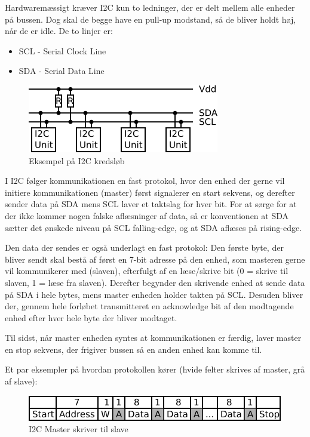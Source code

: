 Hardwaremæssigt kræver I2C kun to ledninger, der er delt mellem alle enheder på bussen. Dog skal de begge have en pull-up modstand, så de bliver holdt høj, når de er idle. De to linjer er:

\begin{itemize}
    \item SCL - Serial Clock Line
    \item SDA - Serial Data Line
\end{itemize}

\begin{figure}[H] \centering
    \includegraphics{0_Filer/Figuer/5_HW_Design/I2C_opsaetning.png}
    \caption{Eksempel på I2C kredsløb}
    \label{fig:HWD_I2C_kreds}
\end{figure}

I I2C følger kommunikationen en fast protokol, hvor den enhed der gerne vil initiere kommunikationen (master) først signalerer en start sekvens, og derefter sender data på SDA mens SCL laver et taktslag for hver bit. For at sørge for at der ikke kommer nogen falske aflæsninger af data, så er konventionen at SDA sætter det ønskede niveau på SCL falling-edge, og at SDA aflæses på rising-edge.

Den data der sendes er også underlagt en fast protokol: Den første byte, der bliver sendt skal bestå af først en 7-bit adresse på den enhed, som masteren gerne vil kommunikerer med (slaven), efterfulgt af en læse/skrive bit (0 = skrive til slaven, 1 = læse fra slaven). Derefter begynder den skrivende enhed at sende data på SDA i hele bytes, mens master enheden holder takten på SCL. Desuden bliver der, gennem hele forløbet transmitteret en acknowledge bit af den modtagende enhed efter hver hele byte der bliver modtaget.

Til sidst, når master enheden syntes at kommunikationen er færdig, laver master en stop sekvens, der frigiver bussen så en anden enhed kan komme til.

Et par eksempler på hvordan protokollen kører (hvide felter skrives af master, grå af slave):

\begin{figure}[H] \centering
    \includegraphics{0_Filer/Figuer/5_HW_Design/I2C_Write.png}
    \caption{I2C Master skriver til slave}
    \label{fig:HWD_I2C_write}
\end{figure}

